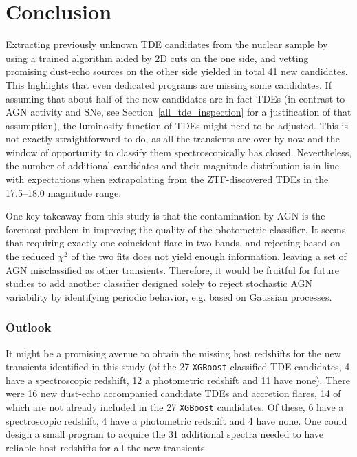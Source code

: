 \section{Conclusion}\label{nuc_conclusion}
Extracting previously unknown TDE candidates from the nuclear sample by using a trained algorithm aided by 2D cuts on the one side, and vetting promising dust-echo sources on the other side yielded in total 41 new candidates. This highlights that even dedicated programs are missing some candidates. If assuming that about half of the new candidates are in fact TDEs (in contrast to AGN activity and SNe, see Section~\ref{all_tde_inspection} for a justification of that assumption), the luminosity function of TDEs might need to be adjusted. This is not exactly straightforward to do, as all the transients are over by now and the window of opportunity to classify them spectroscopically has closed. Nevertheless, the number of additional candidates and their magnitude distribution is in line with expectations when extrapolating from the ZTF-discovered TDEs in the 17.5--18.0 magnitude range.

One key takeaway from this study is that the contamination by AGN is the foremost problem in improving the quality of the photometric classifier. It seems that requiring exactly one coincident flare in two bands, and rejecting based on the reduced $\chi^2$ of the two fits does not yield enough information, leaving a set of AGN misclassified as other transients. Therefore, it would be fruitful for future studies to add another classifier designed solely to reject stochastic AGN variability by identifying periodic behavior, e.g. based on Gaussian processes.

\subsubsection{Outlook}

It might be a promising avenue to obtain the missing host redshifts for the new transients identified in this study (of the 27 \texttt{XGBoost}-classified TDE candidates, 4 have a spectroscopic redshift, 12 a photometric redshift and 11 have none). There were 16 new dust-echo accompanied candidate TDEs and accretion flares, 14 of which are not already included in the 27 \texttt{XGBoost} candidates. Of these, 6 have a spectroscopic redshift, 4 have a photometric redshift and 4 have none. One could design a small program to acquire the 31 additional spectra needed to have reliable host redshifts for all the new transients.

